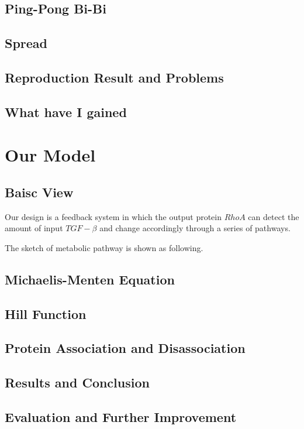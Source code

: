 \documentclass[12pt]{article}
\begin{document}
\subsection{Ping-Pong Bi-Bi}
\subsection{Spread}
\subsection{Reproduction Result and Problems}
\subsection{What have I gained}


\section{Our Model}
\subsection{Baisc View}
Our design is a feedback system in which the output protein $RhoA$ can detect the amount of input $TGF-\beta$ and change accordingly through a series of pathways.

The sketch of metabolic pathway is shown as following.

\subsection{Michaelis-Menten Equation}
\subsection{Hill Function}
\subsection{Protein Association and Disassociation}
\subsection{Results and Conclusion}
\subsection{Evaluation and Further Improvement}
\end{document}
